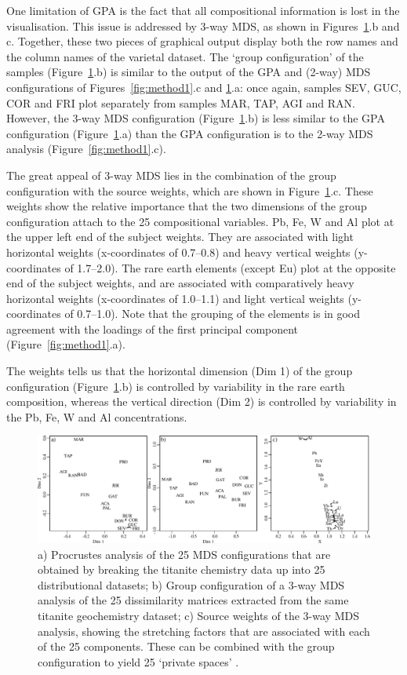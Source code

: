 \documentclass{article}
\begin{document}
One limitation of GPA is the fact that all compositional information
is lost in the visualisation. This issue is addressed by 3-way MDS, as
shown in Figures~\ref{fig:method2}.b and c. Together, these two pieces
of graphical output display both the row names and the column names of
the varietal dataset. The `group configuration' of the samples
(Figure~\ref{fig:method2}.b) is similar to the output of the GPA and
(2-way) MDS configurations of Figures~\ref{fig:method1}.c and
\ref{fig:method2}.a: once again, samples SEV, GUC, COR and FRI plot
separately from samples MAR, TAP, AGI and RAN. However, the 3-way MDS
configuration (Figure~\ref{fig:method2}.b) is less similar to the GPA
configuration (Figure~\ref{fig:method2}.a) than the GPA configuration
is to the 2-way MDS analysis (Figure~\ref{fig:method1}.c).\medskip

The great appeal of 3-way MDS lies in the combination of the group
configuration with the source weights, which are shown in
Figure~\ref{fig:method2}.c. These weights show the relative importance
that the two dimensions of the group configuration attach to the 25
compositional variables.  Pb, Fe, W and Al plot at the upper left end
of the subject weights. They are associated with light horizontal
weights (x-coordinates of 0.7--0.8) and heavy vertical weights
(y-coordinates of 1.7--2.0).  The rare earth elements (except Eu) plot
at the opposite end of the subject weights, and are associated with
comparatively heavy horizontal weights (x-coordinates of 1.0--1.1) and
light vertical weights (y-coordinates of 0.7--1.0). Note that the
grouping of the elements is in good agreement with the loadings of the
first principal component (Figure~\ref{fig:method1}.a).\medskip

The weights tells us that the horizontal dimension (Dim 1) of the
group configuration (Figure~\ref{fig:method2}.b) is controlled by
variability in the rare earth composition, whereas the vertical
direction (Dim 2) is controlled by variability in the Pb, Fe, W and Al
concentrations.

\begin{figure}
\includegraphics[height=.7\textheight]{Fig3.pdf}
\caption{a) Procrustes analysis of the 25 MDS configurations that are
  obtained by breaking the titanite chemistry data up into 25
  distributional datasets; b) Group configuration of a 3-way MDS
  analysis of the 25 dissimilarity matrices extracted from the same
  titanite geochemistry dataset; c) Source weights of the 3-way MDS
  analysis, showing the stretching factors that are associated with
  each of the 25 components. These can be combined with the group
  configuration to yield 25 `private spaces' \protect\cite{arabie1987,vermeesch2015}.}
\label{fig:method2}
\end{figure}
\end{document}
